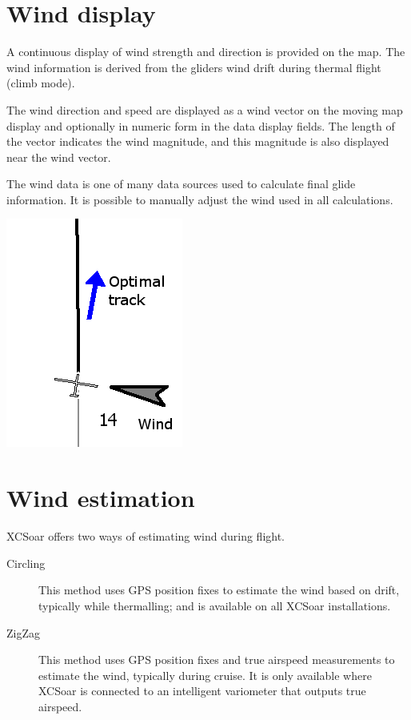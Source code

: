 \documentclass[a4paper,12pt]{refrep}
\begin{document}
\section{Wind display}

A continuous display of wind strength and direction is provided on the
map.  The wind information is derived from the gliders wind drift
during thermal flight (climb mode).

The wind direction and speed are displayed as a wind vector on the
moving map display and optionally in numeric form in the data display
fields.  The length of the vector indicates the wind magnitude, and
this magnitude is also displayed near the wind vector.

The wind data is one of many data sources used to calculate final
glide information.  It is possible to manually adjust the wind used in
all calculations.

\begin{center}
\includegraphics[angle=0,width=0.5\linewidth,keepaspectratio='true']{figures/optwind.png}


\end{center}

\section{Wind estimation}\label{sec:wind-estimation}

XCSoar offers two ways of estimating wind during flight.
\begin{description}
\item[Circling]  This method uses GPS position fixes to estimate the wind
  based on drift, typically while thermalling; and is available on all
  XCSoar installations.
\item[ZigZag]  This method uses GPS position fixes and true airspeed measurements
  to estimate the wind, typically during cruise.  It is only available where
  XCSoar is connected to an intelligent variometer that outputs true airspeed.
\end{description}
\end{document}
